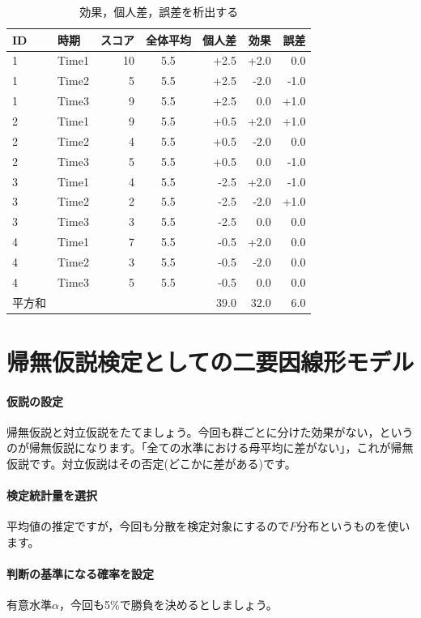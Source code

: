 \documentclass{ltjsarticle}
\begin{document}
\begin{table}[ht]
  \centering
  \caption{効果，個人差，誤差を析出する} 
  \begin{tabular}{llrcrrr}
    \hline
  ID & 時期 & スコア & 全体平均 & 個人差 & 効果 & 誤差 \\ 
    \hline
  1 & Time1 & 10 & 5.5 & +2.5 & +2.0 & 0.0\\ 
    1 & Time2 & 5 & 5.5 & +2.5 & -2.0 & -1.0\\ 
    1 & Time3 & 9 & 5.5 & +2.5 & 0.0 & +1.0\\ 
    2 & Time1 & 9 & 5.5 & +0.5 & +2.0 & +1.0\\ 
    2 & Time2 & 4 & 5.5 & +0.5 & -2.0 & 0.0\\ 
    2 & Time3 & 5 & 5.5 & +0.5 & 0.0 & -1.0\\ 
    3 & Time1 & 4 & 5.5 & -2.5 & +2.0 & -1.0\\ 
    3 & Time2 & 2 & 5.5 & -2.5 & -2.0 & +1.0\\ 
    3 & Time3 & 3& 5.5 & -2.5 & 0.0 & 0.0 \\ 
    4 & Time1 & 7 & 5.5 & -0.5 & +2.0 & 0.0\\ 
    4 & Time2 & 3 & 5.5 & -0.5 & -2.0 & 0.0\\ 
    4 & Time3 & 5& 5.5  & -0.5 & 0.0 & 0.0 \\ 
     \hline\hline
  平方和&&&&39.0 & 32.0&6.0\\\hline
  \end{tabular}
  \label{tbl::22_07}
  \end{table}

  \section{帰無仮説検定としての二要因線形モデル}
  \paragraph{仮説の設定}帰無仮説と対立仮説をたてましょう。今回も群ごとに分けた効果がない，というのが帰無仮説になります。「全ての水準における母平均に差がない」，これが帰無仮説です。対立仮説はその否定(どこかに差がある)です。
  \paragraph{検定統計量を選択}平均値の推定ですが，今回も分散を検定対象にするので$F$分布というものを使います。
  \paragraph{判断の基準になる確率を設定}有意水準$\alpha$，今回も5\%で勝負を決めるとしましょう。
\end{document}
